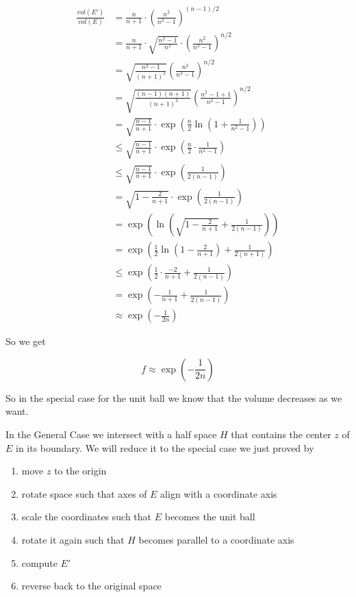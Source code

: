 \begin{pr}
\begin{align*}\frac{vol(E')}{vol(E)}&=\frac{n}{n+1}\cdot \left(\frac{n^2}{n^2-1}\right)^{(n-1)/2}\\
&= \frac{n}{n+1}\cdot \sqrt{\frac{n^2-1}{n^2}} \cdot \left(\frac{n^2}{n^2-1}\right)^{n/2}\\
&=\sqrt{\frac{n^2-1}{(n+1)^2}} \left(\frac{n^2}{n^2-1}\right)^{n/2}\\
&=\sqrt{\frac{(n-1)(n+1)}{(n+1)^2}} \left(\frac{n^2-1+1}{n^2-1}\right)^{n/2}\\
&= \sqrt{\frac{n-1}{n+1}} \cdot \exp\left(\frac{n}{2} \ln (1+\frac{1}{n^2-1})\right)\\
&\leq \sqrt{\frac{n-1}{n+1}} \cdot \exp\left(\frac{n}{2} \cdot \frac{1}{n^2-1}\right)\\
&\leq \sqrt{\frac{n-1}{n+1}} \cdot \exp\left(\frac{1}{2(n-1)}\right)\\
&=\sqrt{1-\frac{2}{n+1}}\cdot \exp\left(\frac{1}{2(n-1)}\right)\\
&= \exp \left(\ln\left(\sqrt{1-\frac{2}{n+1}}+\frac{1}{2(n-1)}\right)\right)\\
&=\exp \left(\frac{1}{2}\ln (1-\frac{2}{n+1}) +\frac{1}{2(n+1)}\right)\\
&\leq \exp \left(\frac{1}{2} \cdot \frac{-2}{n+1} + \frac{1}{2(n-1)}\right)\\
&= \exp \left(-\frac{1}{n+1}+\frac{1}{2(n-1)}\right)\\
&\approx \exp \left(-\frac{1}{2n}\right)
\end{align*}

So we get

\[f \approx \exp \left(-\frac{1}{2n}\right)\]

\end{pr}

So in the special case for the unit ball we know that the volume decreases as we want.

In the General Case we intersect with a half space $H$ that contains the center $z$ of $E$ in its boundary. We will reduce it to the special case we just proved by

\begin{enumerate}
\item move $z$ to the origin
\item rotate space such that axes of $E$ align with a coordinate axis
\item scale the coordinates such that $E$ becomes the unit ball
\item rotate it again such that $H$ becomes parallel to a coordinate axis
\item compute $E'$
\item reverse back to the original space
\end{enumerate}

